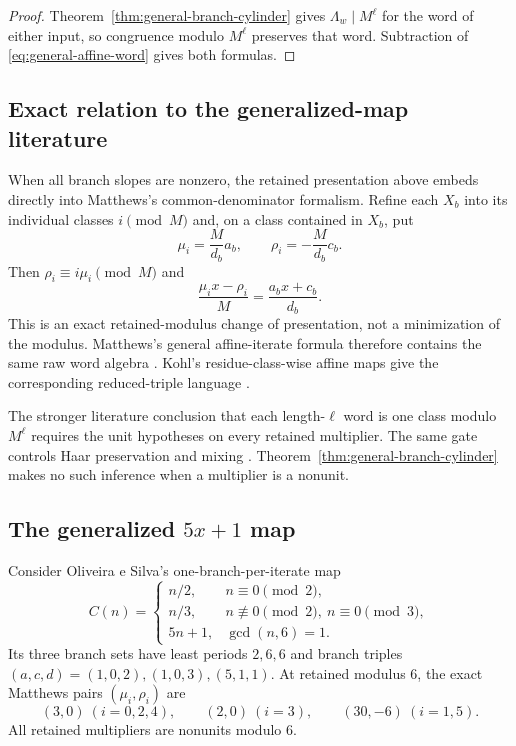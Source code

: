 \begin{proof}
Theorem~\ref{thm:general-branch-cylinder} gives
$\Lambda_w\mid M^\ell$ for the word of either input, so congruence modulo
$M^\ell$ preserves that word.  Subtraction of
\eqref{eq:general-affine-word} gives both formulas.
\end{proof}

\subsection{Exact relation to the generalized-map literature}

When all branch slopes are nonzero, the retained presentation above embeds
directly into Matthews's common-denominator formalism.  Refine each $X_b$
into its individual classes $i\pmod M$ and, on a class contained in $X_b$,
put
\begin{equation}
 \mu_i=\frac{M}{d_b}a_b,
 \qquad
 \rho_i=-\frac{M}{d_b}c_b.
 \label{eq:matthews-embedding}
\end{equation}
Then $\rho_i\equiv i\mu_i\pmod M$ and
\[
 \frac{\mu_i x-\rho_i}{M}=\frac{a_bx+c_b}{d_b}.
\]
This is an exact retained-modulus change of presentation, not a minimization
of the modulus.  Matthews's general affine-iterate formula therefore contains
the same raw word algebra
\cite[author-form pp.~2--4, Eq.~(3), Theorems~2.1--2.2]{Matthews2010}.
Kohl's residue-class-wise affine maps give the corresponding reduced-triple
language \cite[Definition~1.1 and Remark~1.2]{Kohl2008}.

The stronger literature conclusion that each length-$\ell$ word is one class
modulo $M^\ell$ requires the unit hypotheses on every retained multiplier.
The same gate controls Haar preservation and mixing
\cite[pp.~172--174, Lemmas~3--5 and Corollary~1]{MatthewsWatts1984}.
Theorem~\ref{thm:general-branch-cylinder} makes no such inference when a
multiplier is a nonunit.

\subsection{The generalized \texorpdfstring{$5x+1$}{5x+1} map}

Consider Oliveira e Silva's one-branch-per-iterate map
\begin{equation}
 C(n)=
 \begin{cases}
 n/2,&n\equiv0\pmod2,\\
 n/3,&n\not\equiv0\pmod2,\ n\equiv0\pmod3,\\
 5n+1,&\gcd(n,6)=1.
 \end{cases}
 \label{eq:generalized-five-map}
\end{equation}
Its three branch sets have least periods $2,6,6$ and branch triples
$(a,c,d)=(1,0,2),(1,0,3),(5,1,1)$.  At retained modulus $6$, the exact
Matthews pairs $(\mu_i,\rho_i)$ are
\begin{equation}
 (3,0)\ (i=0,2,4),\qquad
 (2,0)\ (i=3),\qquad
 (30,-6)\ (i=1,5).
 \label{eq:five-map-matthews-data}
\end{equation}
All retained multipliers are nonunits modulo $6$.

